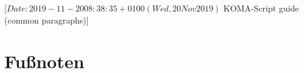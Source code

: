 %
%
%
%
%
%
%
%
% 
%
%
%
%

%
                 [$Date: 2019-11-20 08:38:35 +0100 (Wed, 20 Nov 2019) $
                  KOMA-Script guide (common paragraphs)]

\section{Fußnoten}
%
\BeginIndexGroup
{}%


